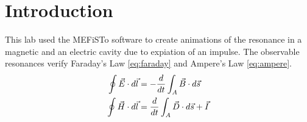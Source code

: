 \section{Introduction}\label{sec:intro}
This lab used the MEFiSTo software to create animations of the resonance in a magnetic and an electric cavity due to expiation of an impulse. The observable resonances verify Faraday's Law \eqref{eq:faraday} and Ampere's Law \eqref{eq:ampere}. 
\begin{align}
	\oint \vec{E} \cdot d\vec{l} &= - {d \over dt} \int_A \vec{B} \cdot d\vec{s} \label{eq:faraday} \\
	\oint \vec{H} \cdot d\vec{l} &= {d \over dt} \int_A \vec{D} \cdot d\vec{s} + \vec{I} \label{eq:ampere}
\end{align}
